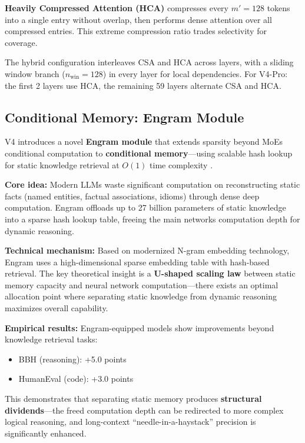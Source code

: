 \documentclass[11pt,a4paper]{article}
\begin{document}
\textbf{Heavily Compressed Attention (HCA)} compresses every $m'=128$ tokens into a single entry without overlap, then performs dense attention over all compressed entries. This extreme compression ratio trades selectivity for coverage.

The hybrid configuration interleaves CSA and HCA across layers, with a sliding window branch ($n_{\text{win}}=128$) in every layer for local dependencies. For V4-Pro: the first 2 layers use HCA, the remaining 59 layers alternate CSA and HCA.

\subsection{Conditional Memory: Engram Module}
\label{sec:engram}

V4 introduces a novel \textbf{Engram module} that extends sparsity beyond MoE{\textquotesingle}s conditional computation to \textbf{conditional memory}---using scalable hash lookup for static knowledge retrieval at $O(1)$ time complexity \cite{deepseek-engram}.

\textbf{Core idea:} Modern LLMs waste significant computation on reconstructing static facts (named entities, factual associations, idioms) through dense deep computation. Engram offloads up to 27 billion parameters of static knowledge into a sparse hash lookup table, freeing the main network{\textquotesingle}s computation depth for dynamic reasoning.

\textbf{Technical mechanism:} Based on modernized N-gram embedding technology, Engram uses a high-dimensional sparse embedding table with hash-based retrieval. The key theoretical insight is a \textbf{U-shaped scaling law} between static memory capacity and neural network computation---there exists an optimal allocation point where separating static knowledge from dynamic reasoning maximizes overall capability.

\textbf{Empirical results:} Engram-equipped models show improvements beyond knowledge retrieval tasks:
\begin{itemize}
    \item BBH (reasoning): +5.0 points
    \item HumanEval (code): +3.0 points
\end{itemize}

This demonstrates that separating static memory produces \textbf{structural dividends}---the freed computation depth can be redirected to more complex logical reasoning, and long-context {\textquotedblleft}needle-in-a-haystack{\textquotedblright} precision is significantly enhanced.
\end{document}
